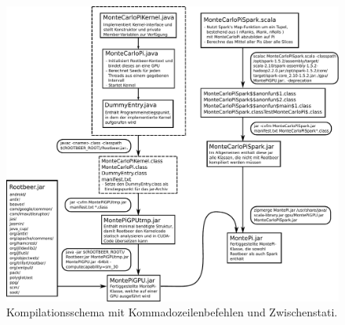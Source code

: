 %


\begin{figure}[H]
	\centering
	\begin{minipage}{\linewidth}
		\includegraphics[width=\linewidth]{compile-structure-deu.pdf}
	\end{minipage}
	\caption{Kompilationsschema mit Kommadozeilenbefehlen und Zwischenstati.}
	\label{fig:compilation}
\end{figure}

